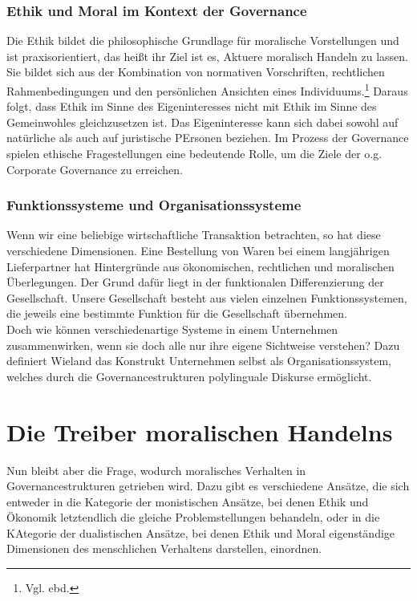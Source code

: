 \documentclass[12pt]{article}
\begin{document}
\section{Ethik und Moral im Kontext der Governance}
Die Ethik bildet die philosophische Grundlage für moralische Vorstellungen und ist praxisorientiert, das heißt ihr Ziel ist es, Aktuere moralisch Handeln zu lassen. Sie bildet sich aus der Kombination von normativen Vorschriften, rechtlichen Rahmenbedingungen und den persönlichen Ansichten eines Individuums.\footnote{Vgl. ebd.} Daraus folgt, dass Ethik im Sinne des Eigeninteresses nicht mit Ethik im Sinne des Gemeinwohles gleichzusetzen ist. Das Eigeninteresse kann sich dabei sowohl auf natürliche als auch auf juristische PErsonen beziehen. Im Prozess der Governance spielen ethische Fragestellungen eine bedeutende Rolle, um die Ziele der o.g. Corporate Governance zu erreichen.

\section{Funktionssysteme und Organisationssysteme}
Wenn wir eine beliebige wirtschaftliche Transaktion betrachten, so hat diese verschiedene Dimensionen. Eine Bestellung von Waren bei einem langjährigen Lieferpartner hat Hintergründe aus ökonomischen, rechtlichen und moralischen Überlegungen. Der Grund dafür liegt in der funktionalen Differenzierung der Gesellschaft. Unsere Gesellschaft besteht aus vielen einzelnen Funktionssystemen, die jeweils eine bestimmte Funktion für die Gesellschaft übernehmen.\\
Doch wie können verschiedenartige Systeme in einem Unternehmen zusammenwirken, wenn sie doch alle nur ihre eigene Sichtweise verstehen? Dazu definiert Wieland das Konstrukt Unternehmen selbst als Organisationssystem, welches durch die Governancestrukturen \glqq polylinguale Diskurse\grqq{} ermöglicht.

\part{Die Treiber moralischen Handelns}
Nun bleibt aber die Frage, wodurch moralisches Verhalten in Governancestrukturen getrieben wird. Dazu gibt es verschiedene Ansätze, die sich entweder in die Kategorie der monistischen Ansätze, bei denen Ethik und Ökonomik letztendlich die gleiche Problemstellungen behandeln, oder in die KAtegorie der dualistischen Ansätze, bei denen Ethik und Moral eigenständige Dimensionen des menschlichen Verhaltens darstellen, einordnen.
\end{document}
